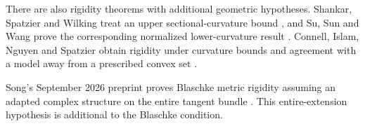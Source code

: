 There are also rigidity theorems with additional geometric hypotheses.
Shankar, Spatzier and Wilking treat an upper sectional-curvature bound
\citep[Proposition~2.1]{ShankarSpatzierWilking2005}, and Su, Sun and
Wang prove the corresponding normalized lower-curvature result
\citep{SuSunWang2016}. Connell, Islam, Nguyen and Spatzier obtain
rigidity under curvature bounds and agreement with a model away
from a prescribed convex set \citep{ConnellIslamNguyenSpatzier2026}.

Song's September 2026 preprint proves Blaschke metric rigidity
assuming an adapted complex structure on the entire tangent bundle
\citep[Theorem~1.3]{Song2026}. This entire-extension hypothesis is
additional to the Blaschke condition.
